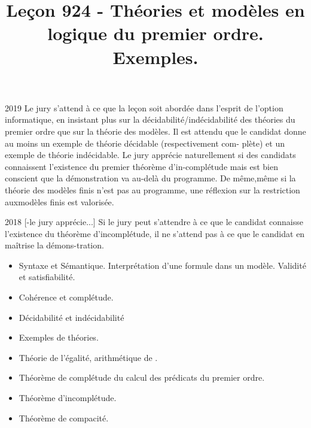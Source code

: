 \documentclass{agregfiche}
\title{Leçon 924 - Théories et modèles en logique du premier ordre.
Exemples.}
\begin{document}
\maketitle

\secrapports

\begin{rapport}{2019}
    Le jury s’attend à ce que la leçon soit abordée dans l’esprit de
    l’option informatique, en insistant plus
    sur la décidabilité/indécidabilité des théories du premier ordre
    que sur la théorie des modèles.
    Il est attendu que le candidat donne au moins un exemple de
    théorie décidable (respectivement com-
    plète) et un exemple de théorie indécidable.
    Le jury apprécie naturellement si des candidats connaissent l’existence du premier théorème d’in-complétude mais est bien conscient que la démonstration va au-delà du programme. De même,même si la théorie des modèles finis n’est pas au programme, une réflexion sur la restriction auxmodèles finis est valorisée.

\end{rapport}

\begin{rapport}{2018}
  [-le jury apprécie...]
  Si le jury peut
    s’attendre à ce que le candidat connaisse
    l’existence du théorème d’incomplétude, il ne s’attend pas à ce
    que le candidat en maîtrise la démons-tration.
\end{rapport}

\secindispensables

\begin{itemize}
    \item Syntaxe et Sémantique. Interprétation d’une formule dans un
	modèle. Validité et satisfiabilité.
    \item Cohérence et complétude.
    \item Décidabilité et indécidabilité
    \item Exemples de théories.
\end{itemize}





\secasavoir

\begin{itemize}
    \item Théorie de l'égalité, arithmétique de .
    \item  Théorème de complétude du calcul des prédicats du premier
      ordre.
    \item Théorème d'incomplétude.
    \item Théorème de compacité.
\end{itemize}
\end{document}
